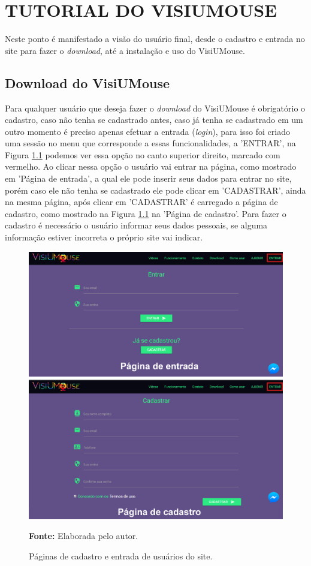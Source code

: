 \chapter{TUTORIAL DO VISIUMOUSE}\label{CAP-tecnologia-visiumouse}
Neste ponto é manifestado a visão do usuário final, desde o cadastro e entrada no site para fazer o \textit{download}, até a instalação e uso do VisiUMouse. 

\section{Download do VisiUMouse}
Para qualquer usuário que deseja fazer o \textit{download} do VisiUMouse é obrigatório o cadastro, caso não tenha se cadastrado antes, caso já tenha se cadastrado em um outro momento é preciso apenas efetuar a entrada (\textit{login}), para isso foi criado uma sessão no menu que corresponde a essas funcionalidades, a 'ENTRAR', na Figura \ref{fig:site-entrar} podemos ver essa opção no canto superior direito, marcado com vermelho. Ao clicar nessa opção o usuário vai entrar na página, como mostrado em 'Página de entrada', a qual ele pode inserir seus dados para entrar no site, porém caso ele não tenha se cadastrado ele pode clicar em 'CADASTRAR', ainda na mesma página, após clicar em 'CADASTRAR' é carregado a página de cadastro, como mostrado na Figura \ref{fig:site-entrar} na 'Página de cadastro'. Para fazer o cadastro é necessário o usuário informar seus dados pessoais, se alguma informação estiver incorreta o próprio site vai indicar. 

\begin{figure}[H]
\caption{Páginas de cadastro e entrada de usuários do site.} 
\centering \includegraphics[scale=0.33]{img/site-entrar.png}

{\fontsize{11}{11}\selectfont \textbf{Fonte:} Elaborada pelo autor.}
\label{fig:site-entrar}
\end{figure}

